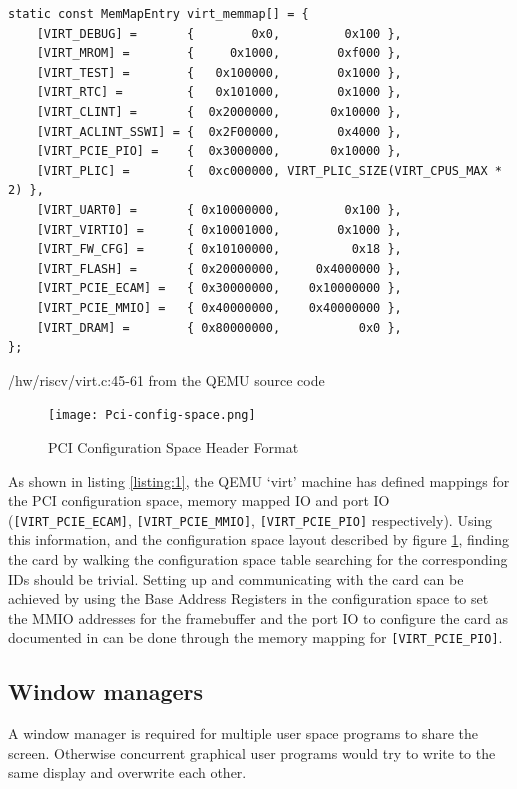 \begin{listing}[!ht]
\begin{verbatim}
static const MemMapEntry virt_memmap[] = {
    [VIRT_DEBUG] =       {        0x0,         0x100 },
    [VIRT_MROM] =        {     0x1000,        0xf000 },
    [VIRT_TEST] =        {   0x100000,        0x1000 },
    [VIRT_RTC] =         {   0x101000,        0x1000 },
    [VIRT_CLINT] =       {  0x2000000,       0x10000 },
    [VIRT_ACLINT_SSWI] = {  0x2F00000,        0x4000 },
    [VIRT_PCIE_PIO] =    {  0x3000000,       0x10000 },
    [VIRT_PLIC] =        {  0xc000000, VIRT_PLIC_SIZE(VIRT_CPUS_MAX * 2) },
    [VIRT_UART0] =       { 0x10000000,         0x100 },
    [VIRT_VIRTIO] =      { 0x10001000,        0x1000 },
    [VIRT_FW_CFG] =      { 0x10100000,          0x18 },
    [VIRT_FLASH] =       { 0x20000000,     0x4000000 },
    [VIRT_PCIE_ECAM] =   { 0x30000000,    0x10000000 },
    [VIRT_PCIE_MMIO] =   { 0x40000000,    0x40000000 },
    [VIRT_DRAM] =        { 0x80000000,           0x0 },
};
\end{verbatim}
\caption{/hw/riscv/virt.c:45-61 from the QEMU source code \cite{qemusource}}
\label{listing:1}
\end{listing}

\begin{figure}[H]
    \centering
    \texttt{[image: Pci-config-space.png]}
    \caption{PCI Configuration Space Header Format \cite{figure:pciecamheader}}
    \label{figure:1}
\end{figure}

As shown in listing \ref{listing:1}, the QEMU `virt' machine has defined mappings 
for the PCI configuration space, memory mapped IO and port IO 
(\texttt{[VIRT_PCIE_ECAM]}, \texttt{[VIRT_PCIE_MMIO]}, \texttt{[VIRT_PCIE_PIO]} respectively).
Using this information, and the configuration space layout described by figure \ref{figure:1},
finding the card by walking the configuration space table searching for the corresponding IDs 
should be trivial. Setting up and communicating with the card can be achieved by using
the Base Address Registers in the configuration space to set the MMIO addresses for the framebuffer
and the port IO to configure the card as documented in \cite{osdevvga} can be done through the
memory mapping for \texttt{[VIRT_PCIE_PIO]}.

\subsection{Window managers}
\label{chapter1:research:winman}
A window manager is required for multiple user space programs to share the screen. Otherwise
concurrent graphical user programs would try to write to the same display and overwrite each other.

